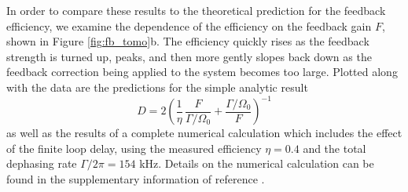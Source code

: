 In order to compare these results to the theoretical prediction for the feedback efficiency, we examine the dependence of the efficiency on the feedback gain $F$, shown in Figure \ref{fig:fb_tomo}b.  The efficiency quickly rises as the feedback strength is turned up, peaks, and then more gently slopes back down as the feedback correction being applied to the system becomes too large.  Plotted along with the data are the predictions for the simple analytic result
    \begin{equation}
    D=2 \left(\displaystyle \frac{1}{\eta}\, \frac{F}{\Gamma/\Omega_0}
+\frac{\Gamma/\Omega_0}{F} \right)^{-1}
    \end{equation}
as well as the results of a complete numerical calculation which includes the effect of the finite loop delay, using the measured efficiency $\eta = 0.4$ and the total dephasing rate $\Gamma/2 \pi = 154$ kHz.  Details on the numerical calculation can be found in the supplementary information of reference \cite{vijay_stabilizing_2012}.





















